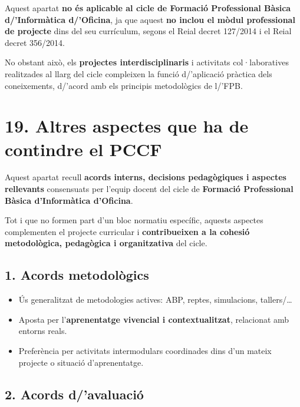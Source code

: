 \documentclass[
  paper=a4,
  ,captions=tableheading
]{scrartcl}
\providecommand{\tightlist}{%
  \setlength{\itemsep}{0pt}\setlength{\parskip}{0pt}}
\begin{document}
Aquest apartat \textbf{no és aplicable al cicle de Formació Professional
Bàsica d/'Informàtica d/'Oficina}, ja que aquest \textbf{no inclou el
mòdul professional de projecte} dins del seu currículum, segons el Reial
decret 127/2014 i el Reial decret 356/2014.

No obstant això, els \textbf{projectes interdisciplinaris} i activitats
col·laboratives realitzades al llarg del cicle compleixen la funció
d/'aplicació pràctica dels coneixements, d/'acord amb els principis
metodològics de l/'FPB.

\hypertarget{altres-aspectes-que-ha-de-contindre-el-pccf}{%
\section{19. Altres aspectes que ha de contindre el
PCCF}\label{altres-aspectes-que-ha-de-contindre-el-pccf}}

Aquest apartat recull \textbf{acords interns, decisions pedagògiques i
aspectes rellevants} consensuats per l'equip docent del cicle de
\textbf{Formació Professional Bàsica d'Informàtica d'Oficina}.

Tot i que no formen part d'un bloc normatiu específic, aquests aspectes
complementen el projecte curricular i \textbf{contribueixen a la cohesió
metodològica, pedagògica i organitzativa} del cicle.

\hypertarget{acords-metodoluxf2gics}{%
\subsection{1. Acords metodològics}\label{acords-metodoluxf2gics}}

\begin{itemize}
\tightlist
\item
  Ús generalitzat de metodologies actives: ABP, reptes, simulacions,
  tallers/\ldots{}
\item
  Aposta per l'\textbf{aprenentatge vivencial i contextualitzat},
  relacionat amb entorns reals.
\item
  Preferència per activitats intermodulars coordinades dins d'un mateix
  projecte o situació d'aprenentatge.
\end{itemize}

\hypertarget{acords-davaluaciuxf3}{%
\subsection{2. Acords d/'avaluació}\label{acords-davaluaciuxf3}}
\end{document}
